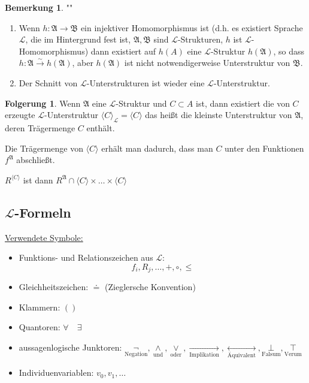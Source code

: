 \documentclass[12pt,parskip=full]{scrartcl}
\newcommand{\heading}{\underline}
\theoremstyle{definition}
\newtheorem{corollary}[theorem]{Folgerung}
\newtheorem{remark}[theorem]{Bemerkung}
\begin{document}
	\begin{remark}""
		\begin{enumerate}
			\item Wenn $h: \mathfrak{A} \to \mathfrak{B}$ ein injektiver Homomorphismus ist (d.h. es existiert Sprache $\mathcal{L}$, die im Hintergrund fest ist, $\mathfrak{A},\mathfrak{B}$ sind $\mathcal{L}$-Strukturen, $h$ ist $\mathcal{L}$-Homomorphismus) dann existiert auf $h(A)$ eine $\mathcal{L}$-Struktur $h(\mathfrak{A})$, so dass $h: \mathfrak{A} \xrightarrow{\sim} h(\mathfrak{A})$, aber $h(\mathfrak{A})$ ist nicht notwendigerweise Unterstruktur von $\mathfrak{B}$.
			\item Der Schnitt von $\mathcal{L}$-Unterstrukturen ist wieder eine $\mathcal{L}$-Unterstruktur.
		\end{enumerate}
	\end{remark}
	
	\begin{corollary}
		Wenn $\mathfrak{A}$ eine $\mathcal{L}$-Struktur und $C \subset A$ ist, dann existiert die von $C$ erzeugte $\mathcal{L}$-Unterstruktur $\langle C \rangle_\mathcal{L} = \langle C \rangle$ das heißt die kleinste Unterstruktur von $\mathfrak{A}$, deren Trägermenge $C$ enthält.
		
		Die Trägermenge von $\langle C \rangle$ erhält man dadurch, dass man $C$ unter den Funktionen $f^\mathfrak{A}$ abschließt.
		
		$R^{\langle C \rangle}$ ist dann $R^\mathfrak{A} \cap \langle C \rangle \times \dots \times \langle C \rangle$
	\end{corollary}

	\subsection{\texorpdfstring{$\mathcal{L}$-Formeln}{L-Formeln}}

	\heading{Verwendete Symbole:}
	\begin{itemize}
		\item Funktions- und Relationszeichen aus $\mathcal{L}$:
		\begin{equation*}
			f_i, R_j, \dots, +, \circ, \leq
		\end{equation*}
		\item Gleichheitszeichen: $\doteq$ (Zieglersche Konvention)
		\item Klammern: $()$
		\item Quantoren: $\forall \quad \exists$
		\item aussagenlogische Junktoren: $\underset{\text{Negation}}{\lnot}, \underset{\text{und}}{\land}, \underset{\text{oder}}{\lor}, \underset{\text{Implikation}}{\rightarrow}, \underset{\text{Äquivalent}}{\leftrightarrow}, \underset{\text{Falsum}}{\bot}, \underset{\text{Verum}}{\top}$
		\item Individuenvariablen: $v_0, v_1, \dots$
	\end{itemize}
\end{document}

